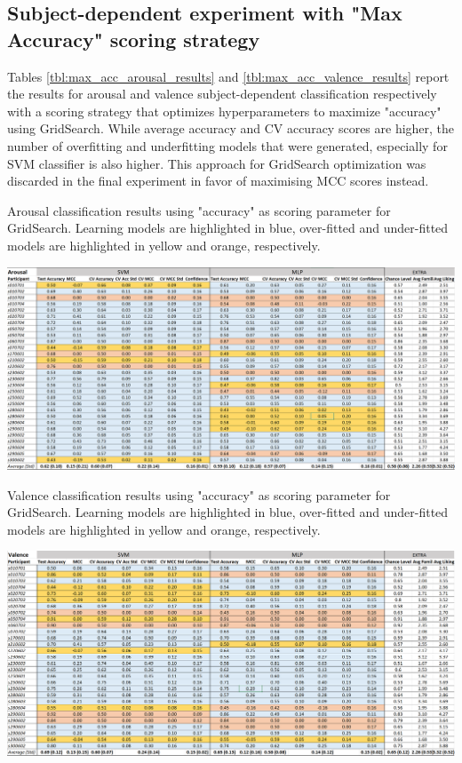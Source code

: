 \subsection{Subject-dependent experiment with "Max Accuracy" scoring strategy}
\label{sec:appendix_A3.6}
Tables \ref{tbl:max_acc_arousal_results} and \ref{tbl:max_acc_valence_results} report the results for arousal and valence subject-dependent classification respectively with a scoring strategy that optimizes hyperparameters to maximize "accuracy" using GridSearch. While average accuracy and CV accuracy scores are higher, the number of overfitting and underfitting models that were generated, especially for \ac{SVM} classifier is also higher. This approach for GridSearch optimization was discarded in the final experiment in favor of maximising \ac{MCC} scores instead.
\begin{table}[h!]
  \caption{Arousal classification results using "accuracy" as scoring parameter for GridSearch. Learning models are highlighted in blue, over-fitted and under-fitted models are highlighted in yellow and orange, respectively.}
  \label{tbl:max_acc_arousal_results}
  \includegraphics[width=\linewidth]{img/appendix/arousal_max_acc_results.png}
\end{table}

\begin{table}[h!]
  \caption{Valence classification results using "accuracy" as scoring parameter for GridSearch. Learning models are highlighted in blue, over-fitted and under-fitted models are highlighted in yellow and orange, respectively.}
  \label{tbl:max_acc_valence_results}
  \includegraphics[width=\linewidth]{img/appendix/valence_max_acc_results.png}
\end{table}


